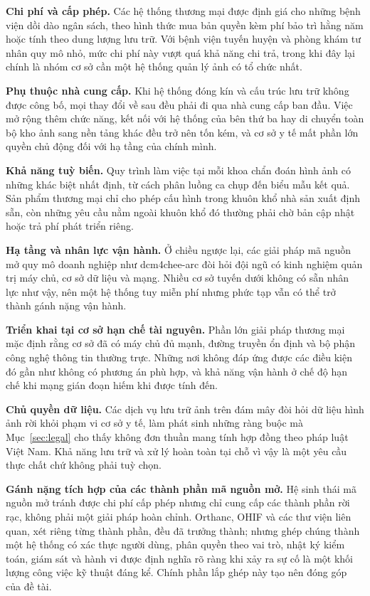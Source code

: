 \textbf{Chi phí và cấp phép.} Các hệ thống thương mại được định giá cho những
bệnh viện dồi dào ngân sách, theo hình thức mua bản quyền kèm phí bảo trì hằng
năm hoặc tính theo dung lượng lưu trữ. Với bệnh viện tuyến huyện và phòng khám
tư nhân quy mô nhỏ, mức chi phí này vượt quá khả năng chi trả, trong khi đây lại
chính là nhóm cơ sở cần một hệ thống quản lý ảnh có tổ chức nhất.

\textbf{Phụ thuộc nhà cung cấp.} Khi hệ thống đóng kín và cấu trúc lưu trữ không
được công bố, mọi thay đổi về sau đều phải đi qua nhà cung cấp ban đầu. Việc mở
rộng thêm chức năng, kết nối với hệ thống của bên thứ ba hay di chuyển toàn bộ
kho ảnh sang nền tảng khác đều trở nên tốn kém, và cơ sở y tế mất phần lớn quyền
chủ động đối với hạ tầng của chính mình.

\textbf{Khả năng tuỳ biến.} Quy trình làm việc tại mỗi khoa chẩn đoán hình ảnh
có những khác biệt nhất định, từ cách phân luồng ca chụp đến biểu mẫu kết quả.
Sản phẩm thương mại chỉ cho phép cấu hình trong khuôn khổ nhà sản xuất định sẵn,
còn những yêu cầu nằm ngoài khuôn khổ đó thường phải chờ bản cập nhật hoặc trả
phí phát triển riêng.

\textbf{Hạ tầng và nhân lực vận hành.} Ở chiều ngược lại, các giải pháp mã nguồn
mở quy mô doanh nghiệp như dcm4chee-arc đòi hỏi đội ngũ có kinh nghiệm quản trị
máy chủ, cơ sở dữ liệu và mạng. Nhiều cơ sở tuyến dưới không có sẵn nhân lực như
vậy, nên một hệ thống tuy miễn phí nhưng phức tạp vẫn có thể trở thành gánh nặng
vận hành.

\textbf{Triển khai tại cơ sở hạn chế tài nguyên.} Phần lớn giải pháp thương mại
mặc định rằng cơ sở đã có máy chủ đủ mạnh, đường truyền ổn định và bộ phận công
nghệ thông tin thường trực. Những nơi không đáp ứng được các điều kiện đó gần
như không có phương án phù hợp, và khả năng vận hành ở chế độ hạn chế khi mạng
gián đoạn hiếm khi được tính đến.

\textbf{Chủ quyền dữ liệu.} Các dịch vụ lưu trữ ảnh trên đám mây đòi hỏi dữ liệu
hình ảnh rời khỏi phạm vi cơ sở y tế, làm phát sinh những ràng buộc mà
Mục~\ref{sec:legal} cho thấy không đơn thuần mang tính hợp đồng theo pháp luật
Việt Nam. Khả năng lưu trữ và xử lý hoàn toàn tại chỗ vì vậy là một yêu cầu
thực chất chứ không phải tuỳ chọn.

\textbf{Gánh nặng tích hợp của các thành phần mã nguồn mở.} Hệ sinh thái mã
nguồn mở tránh được chi phí cấp phép nhưng chỉ cung cấp các thành phần rời rạc,
không phải một giải pháp hoàn chỉnh. Orthanc, OHIF và các thư viện liên quan,
xét riêng từng thành phần, đều đã trưởng thành; nhưng ghép chúng thành một hệ
thống có xác thực người dùng, phân quyền theo vai trò, nhật ký kiểm toán, giám
sát và hành vi được định nghĩa rõ ràng khi xảy ra sự cố là một khối lượng công
việc kỹ thuật đáng kể. Chính phần lắp ghép này tạo nên đóng góp của đề tài.

